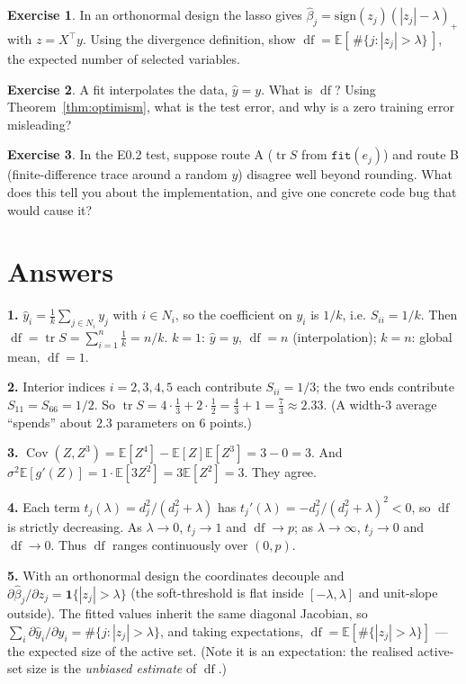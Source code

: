 \documentclass[11pt]{article}
\DeclareMathOperator{\tr}{tr}
\DeclareMathOperator{\Cov}{Cov}
\DeclareMathOperator{\df}{df}
\newcommand{\E}{\mathbb{E}}
\newcommand{\yhat}{\hat y}
\theoremstyle{definition}
\newtheorem{exercise}{Exercise}
\theoremstyle{plain}
\begin{document}
\begin{exercise}
In an orthonormal design the lasso gives $\hat\beta_j=\mathrm{sign}(z_j)(|z_j|-\lambda)_+$
with $z=X^\top y$. Using the divergence definition, show
$\df=\E[\,\#\{j:|z_j|>\lambda\}\,]$, the expected number of selected variables.
\end{exercise}

\begin{exercise}
A fit interpolates the data, $\yhat=y$. What is $\df$? Using
Theorem~\ref{thm:optimism}, what is the test error, and why is a zero training
error misleading?
\end{exercise}

\begin{exercise}
In the E0.2 test, suppose route A ($\tr S$ from $\texttt{fit}(e_j)$) and route B
(finite-difference trace around a random $y$) disagree well beyond rounding. What
does this tell you about the implementation, and give one concrete code bug that
would cause it?
\end{exercise}

\section*{Answers}

\textbf{1.} $\yhat_i=\frac1k\sum_{j\in N_i}y_j$ with $i\in N_i$, so the coefficient
on $y_i$ is $1/k$, i.e. $S_{ii}=1/k$. Then $\df=\tr S=\sum_{i=1}^n \frac1k=n/k$.
$k=1$: $\yhat=y$, $\df=n$ (interpolation); $k=n$: global mean, $\df=1$.

\textbf{2.} Interior indices $i=2,3,4,5$ each contribute $S_{ii}=1/3$; the two ends
contribute $S_{11}=S_{66}=1/2$. So $\tr S = 4\cdot\frac13 + 2\cdot\frac12
= \frac43 + 1 = \frac73 \approx 2.33$. (A width-$3$ average ``spends'' about $2.3$
parameters on $6$ points.)

\textbf{3.} $\Cov(Z,Z^3)=\E[Z^4]-\E[Z]\E[Z^3]=3-0=3$. And
$\sigma^2\E[g'(Z)]=1\cdot\E[3Z^2]=3\E[Z^2]=3$. They agree.

\textbf{4.} Each term $t_j(\lambda)=d_j^2/(d_j^2+\lambda)$ has
$t_j'(\lambda)=-d_j^2/(d_j^2+\lambda)^2<0$, so $\df$ is strictly decreasing. As
$\lambda\to0$, $t_j\to1$ and $\df\to p$; as $\lambda\to\infty$, $t_j\to0$ and
$\df\to0$. Thus $\df$ ranges continuously over $(0,p)$.

\textbf{5.} With an orthonormal design the coordinates decouple and
$\partial\hat\beta_j/\partial z_j=\mathbf 1\{|z_j|>\lambda\}$ (the soft-threshold is
flat inside $[-\lambda,\lambda]$ and unit-slope outside). The fitted values inherit
the same diagonal Jacobian, so
$\sum_i\partial\yhat_i/\partial y_i=\#\{j:|z_j|>\lambda\}$, and taking expectations,
$\df=\E[\#\{|z_j|>\lambda\}]$ --- the expected size of the active set. (Note it is an
expectation: the realised active-set size is the \emph{unbiased estimate} of $\df$.)
\end{document}
